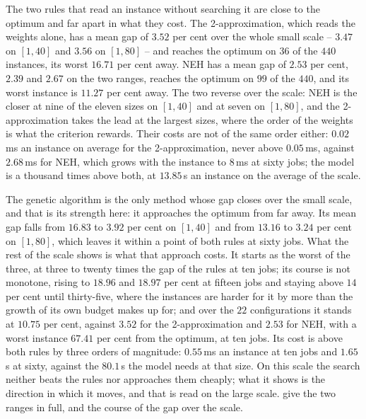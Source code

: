 \documentclass[12pt]{article}
\begin{document}
\begin{sloppypar}
        The two rules that read an instance without searching it are close to the optimum and far apart
        in what they cost. The 2-approximation, which reads the weights alone, has a mean gap of $3.52$
        per cent over the whole small scale -- $3.47$ on $[1,40]$ and $3.56$ on $[1,80]$ -- and reaches
        the optimum on $36$ of the $440$ instances, its worst $16.71$ per cent away. NEH has a mean gap
        of $2.53$ per cent, $2.39$ and $2.67$ on the two ranges, reaches the optimum on $99$ of the
        $440$, and its worst instance is $11.27$ per cent away. The two reverse over the scale: NEH is
        the closer at nine of the eleven sizes on $[1,40]$ and at seven on $[1,80]$, and the
        2-approximation takes the lead at the largest sizes, where the order of the weights is what the
        criterion rewards. Their costs are not of the same order either: $0.02$\,ms an instance on
        average for the 2-approximation, never above $0.05$\,ms, against $2.68$\,ms for NEH, which grows
        with the instance to $8$\,ms at sixty jobs; the model is a thousand times above both, at
        $13.85$\,s an instance on the average of the scale.
        
        The genetic algorithm is the only method whose gap closes over the small scale, and that is its
        strength here: it approaches the optimum from far away. Its mean gap falls from $16.83$ to $3.92$
        per cent on $[1,40]$ and from $13.16$ to $3.24$ per cent on $[1,80]$, which leaves it within a
        point of both rules at sixty jobs. What the rest of the scale shows is what that approach costs.
        It starts as the worst of the three, at three to twenty times the gap of the rules at ten jobs;
        its course is not monotone, rising to $18.96$ and $18.97$ per cent at fifteen jobs and staying
        above $14$ per cent until thirty-five, where the instances are harder for it by more than the
        growth of its own budget makes up for; and over the $22$ configurations it stands at $10.75$ per
        cent, against $3.52$ for the 2-approximation and $2.53$ for NEH, with a worst instance $67.41$
        per cent from the optimum, at ten jobs. Its cost is above both rules by three orders of
        magnitude: $0.55$\,ms an instance at ten jobs and $1.65$\,s at sixty, against the $80.1$\,s the
        model needs at that size. On this scale the search neither beats the rules nor approaches them
        cheaply; what it shows is the direction in which it moves, and that is read on the large scale.
         give the two ranges in full, and
         the course of the gap over the scale.
        

\end{sloppypar}
\end{document}
